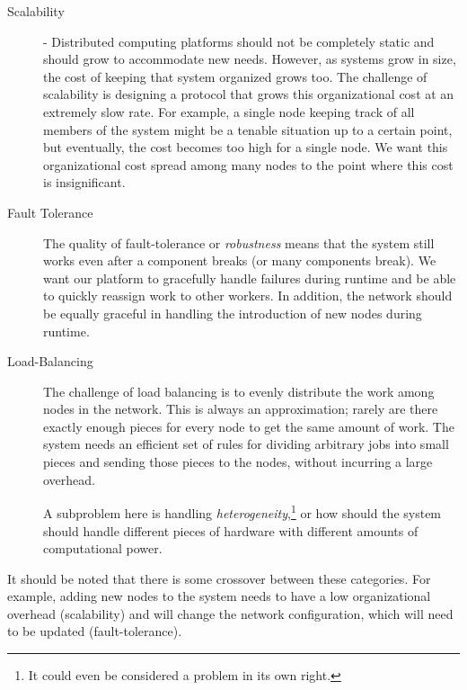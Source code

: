 \begin{description}
	\item[Scalability] - Distributed computing platforms should not be completely static and should grow to accommodate new needs.
	However, as systems grow in size, the cost of keeping that system organized grows too.
	The challenge of scalability is designing a protocol that grows this organizational cost at an extremely slow rate.
	For example, a single node keeping track of all members of the system might be a tenable situation up to a certain point, but eventually, the cost becomes too high for a single node.
	We want this organizational cost spread among many nodes to the point where this cost is insignificant. %
	\item[Fault Tolerance]  
	The quality of fault-tolerance or \textit{robustness} means that the system still works even after a component breaks (or many components break).
	We want our platform to gracefully handle failures during runtime and be able to quickly reassign work to other workers.
	In addition, the network should be equally graceful in handling the introduction of new nodes during runtime.
	
	\item[Load-Balancing]
	The challenge of load balancing is to evenly distribute the work among nodes in the network.
	This is always an approximation; rarely  are there exactly enough pieces for  every node to get the same amount of work.
	The system needs an efficient set of rules for dividing arbitrary jobs into small pieces and sending those pieces to the nodes, without incurring a large overhead.
	
	A subproblem here is handling \textit{heterogeneity},\footnote{It could even be considered a problem in its own right.} or how should the system should handle different pieces of hardware with different amounts of computational power.
	
	
\end{description}
It should be noted that there is some crossover between these categories. 
For example, adding new nodes to the system needs to have a low organizational overhead (scalability) and will change the network configuration, which will need to be updated (fault-tolerance).




